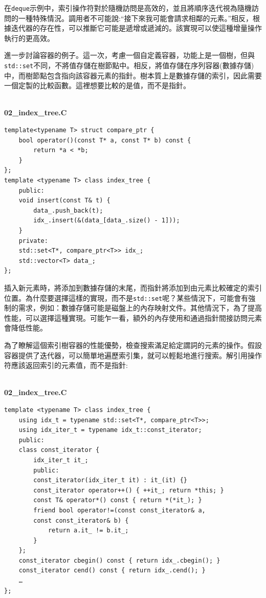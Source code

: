 在\texttt{deque}示例中，索引操作符對於隨機訪問是高效的，並且將順序迭代視為隨機訪問的一種特殊情況。調用者不可能說:“接下來我可能會請求相鄰的元素。”相反，根據迭代器的存在性，可以推斷它可能是遞增或遞減的。該實現可以使這種增量操作執行的更高效。

進一步討論容器的例子。這一次，考慮一個自定義容器，功能上是一個樹，但與\texttt{std::set}不同，不將值存儲在樹節點中。相反，將值存儲在序列容器(數據存儲)中，而樹節點包含指向該容器元素的指針。樹本質上是數據存儲的索引，因此需要一個定製的比較函數。這裡想要比較的是值，而不是指針。

\hspace*{\fill} \\ %
\noindent
\textbf{02\_index\_tree.C}
\begin{lstlisting}[style=styleCXX]
template<typename T> struct compare_ptr {
	bool operator()(const T* a, const T* b) const {
		return *a < *b;
	}
};
template <typename T> class index_tree {
	public:
	void insert(const T& t) { 
		data_.push_back(t);
		idx_.insert(&(data_[data_.size() - 1]));
	}
	private:
	std::set<T*, compare_ptr<T>> idx_;
	std::vector<T> data_;
};
\end{lstlisting}

插入新元素時，將添加到數據存儲的末尾，而指針將添加到由元素比較確定的索引位置。為什麼要選擇這樣的實現，而不是\texttt{std::set}呢？某些情況下，可能會有強制的需求，例如：數據存儲可能是磁盤上的內存映射文件。其他情況下，為了提高性能，可以選擇這種實現。可能乍一看，額外的內存使用和通過指針間接訪問元素會降低性能。 

為了瞭解這個索引樹容器的性能優勢，檢查搜索滿足給定謂詞的元素的操作。假設容器提供了迭代器，可以簡單地遍歷索引集，就可以輕鬆地進行搜索。解引用操作符應該返回索引的元素值，而不是指針:

\hspace*{\fill} \\ %
\noindent
\textbf{02\_index\_tree.C}
\begin{lstlisting}[style=styleCXX]
template <typename T> class index_tree {
	using idx_t = typename std::set<T*, compare_ptr<T>>;
	using idx_iter_t = typename idx_t::const_iterator;
	public:
	class const_iterator {
		idx_iter_t it_;
		public:
		const_iterator(idx_iter_t it) : it_(it) {}
		const_iterator operator++() { ++it_; return *this; }
		const T& operator*() const { return *(*it_); }
		friend bool operator!=(const const_iterator& a,
		const const_iterator& b) {
			return a.it_ != b.it_;
		}
	};
	const_iterator cbegin() const { return idx_.cbegin(); }
	const_iterator cend() const { return idx_.cend(); }
	…
};
\end{lstlisting}

